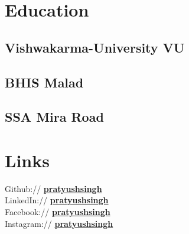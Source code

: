 \documentclass[]{Pratyush-resume-openfont}
\begin{document}
%
%

%
%


%
%

\begin{minipage}[t]{0.33\textwidth} 


\section{Education} 

\subsection{Vishwakarma-University VU}
\sectionsep

\subsection{BHIS Malad}
\sectionsep

\subsection{SSA Mira Road}
\sectionsep


\section{Links} 

Github:// \href{https://github.com/PratyushSingh1}{\bf pratyushsingh} \\
LinkedIn://  \href{https://www.linkedin.com/in/pratyush-singh-dataanalyst/}{\bf pratyushsingh} \\
Facebook:// \href{https://www.facebook.com/pratyush.singh.5872?mibextid=LQQJ4d}{\bf pratyushsingh} \\
Instagram:// \href{https://instagram.com/pratshhh?igshid=OGQ5ZDc2ODk2ZA==}{\bf pratyushsingh}
\sectionsep


\end{minipage}
\end{document}
